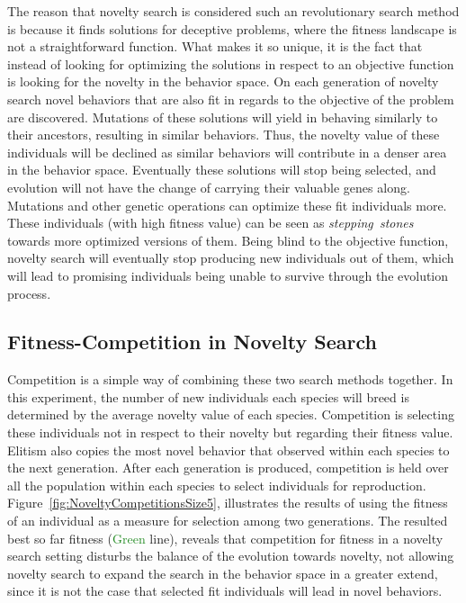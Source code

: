 The reason that novelty search is considered such an revolutionary search method is because it finds solutions for deceptive problems, where the fitness landscape is not a straightforward function. What makes it so unique, it is the fact that instead of looking for optimizing the solutions in respect to an objective function is looking for the novelty in the behavior space. On each generation of novelty search novel behaviors that are also fit in regards to the objective of the problem are discovered. Mutations of these solutions will yield in behaving similarly to their ancestors, resulting in similar behaviors. Thus, the novelty value of these individuals will be declined as similar behaviors will contribute in a denser area in the behavior space. Eventually these solutions will stop being selected, and evolution will not have the change of carrying their valuable genes along. Mutations and other genetic operations can optimize these fit individuals more. These individuals (with high fitness value) can be seen as \emph{stepping~stones}~\citep{lehman2011abandoning} towards more optimized versions of them. Being blind to the objective function, novelty search will eventually stop producing new individuals out of them, which will lead to promising individuals being unable to survive through the evolution process.

\subsection*{Fitness-Competition in Novelty Search}


Competition is a simple way of combining these two search methods together. In this experiment, the number of new individuals each species will breed is determined by the average novelty value of each species. Competition is selecting these individuals not in respect to their novelty but regarding their fitness value. Elitism also copies the most novel behavior that observed within each species to the next generation. After each generation is produced, competition is held over all the population within each species to select individuals for reproduction. Figure~\ref{fig:NoveltyCompetitionsSize5}, illustrates the results of using the fitness of an individual as a measure for selection among two generations. The resulted best so far fitness (\textcolor{ForestGreen}{Green} line), reveals that competition for fitness in a novelty search setting disturbs the balance of the evolution towards novelty, not allowing novelty search to expand the search in the behavior space in a greater extend, since it is not the case that selected fit individuals will lead in novel behaviors. 

